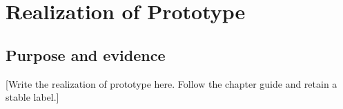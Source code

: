 \chapter{Realization of Prototype}
\label{chap:realization_of_prototype}
\section{Purpose and evidence}
[Write the realization of prototype here. Follow the chapter guide and retain a stable label.]
